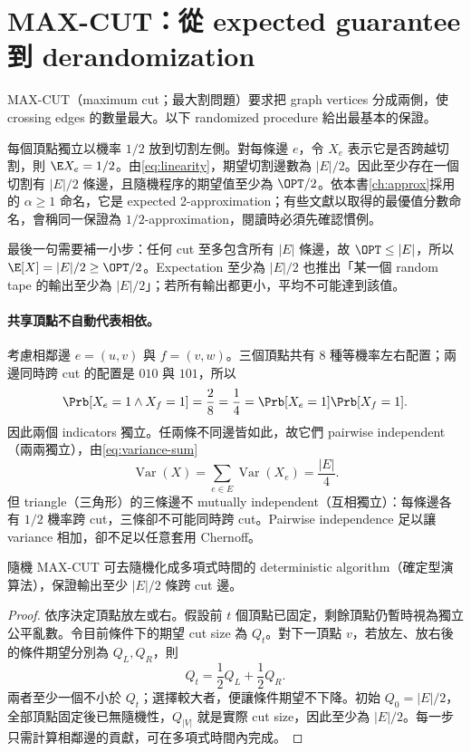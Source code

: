 \documentclass[11pt,a4paper,oneside,openany]{book}
\begin{document}
\section{MAX-CUT：從 expected guarantee 到 derandomization}

MAX-CUT（maximum cut；最大割問題）要求把 graph vertices 分成兩側，使 crossing edges 的數量最大。以下 randomized procedure 給出最基本的保證。
\begin{example}
每個頂點獨立以機率 $1/2$ 放到切割左側。對每條邊 $e$，令 $X_e$ 表示它是否跨越切割，則 $\E X_e=1/2$。由\cref{eq:linearity}，期望切割邊數為 $|E|/2$。因此至少存在一個切割有 $|E|/2$ 條邊，且隨機程序的期望值至少為 $\OPT/2$。依本書\cref{ch:approx}採用的 $\alpha\ge1$ 命名，它是 expected 2-approximation；有些文獻以取得的最優值分數命名，會稱同一保證為 $1/2$-approximation，閱讀時必須先確認慣例。
\end{example}

最後一句需要補一小步：任何 cut 至多包含所有 $|E|$ 條邊，故 $\OPT\le|E|$，所以
\(
 \E[X]=|E|/2\ge\OPT/2
\)。Expectation 至少為 $|E|/2$ 也推出「某一個 random tape 的輸出至少為 $|E|/2$」；若所有輸出都更小，平均不可能達到該值。

\paragraph{共享頂點不自動代表相依。}
考慮相鄰邊 $e=(u,v)$ 與 $f=(v,w)$。三個頂點共有 8 種等機率左右配置；兩邊同時跨 cut 的配置是 $010$ 與 $101$，所以
\[
 \Prb[X_e=1\land X_f=1]=\frac28=\frac14
 =\Prb[X_e=1]\Prb[X_f=1].
\]
因此兩個 indicators 獨立。任兩條不同邊皆如此，故它們 pairwise independent（兩兩獨立），由\cref{eq:variance-sum}
\[
 \operatorname{Var}(X)=\sum_{e\in E}\operatorname{Var}(X_e)
 =\frac{|E|}{4}.
\]
但 triangle（三角形）的三條邊不 mutually independent（互相獨立）：每條邊各有 $1/2$ 機率跨 cut，三條卻不可能同時跨 cut。Pairwise independence 足以讓 variance 相加，卻不足以任意套用 Chernoff。

\begin{theorem}
隨機 MAX-CUT 可去隨機化成多項式時間的 deterministic algorithm（確定型演算法），保證輸出至少 $|E|/2$ 條跨 cut 邊。
\end{theorem}
\begin{proof}
依序決定頂點放左或右。假設前 $t$ 個頂點已固定，剩餘頂點仍暫時視為獨立公平亂數。令目前條件下的期望 cut size 為 $Q_t$。對下一頂點 $v$，若放左、放右後的條件期望分別為 $Q_L,Q_R$，則
\[
 Q_t=\frac12Q_L+\frac12Q_R.
\]
兩者至少一個不小於 $Q_t$；選擇較大者，便讓條件期望不下降。初始 $Q_0=|E|/2$，全部頂點固定後已無隨機性，$Q_{|V|}$ 就是實際 cut size，因此至少為 $|E|/2$。每一步只需計算相鄰邊的貢獻，可在多項式時間內完成。
\end{proof}
\end{document}
